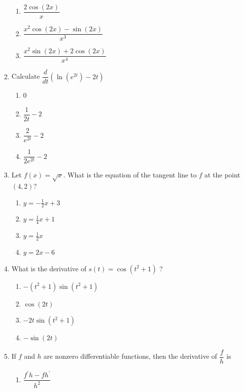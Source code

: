 \documentclass{article}
\begin{document}
\begin{enumerate}
\begin{minipage}[t]{\linewidth}
\begin{enumerate}
			\item  $\dfrac{ 2 \cos(2x)}{x}$
			\item  $\dfrac{ x^2 \cos(2x) - \sin(2x)} { x^3}$
			\item  $\dfrac{ x^2 \sin(2x) + 2 \cos(2x)} {x^4}$
		\end{enumerate}
	\end{minipage}
	\item
	\begin{minipage}[t]{\linewidth}
		Calculate \(\dfrac{d}{dt} \left( \ln(e^{2t}) - 2t \right)\)\\[0.1em]
		\begin{enumerate}
		\itemsep1em
		\item  0
			\item  $\dfrac{1}{2t}-2$
			\item  $\dfrac{2}{e^{2t}}-2$
			\item  $\dfrac{1}{2e^{2t}}-2$
		\end{enumerate}
	\end{minipage}
	\item
	\begin{minipage}[t]{\linewidth}
		Let \(f(x)=\sqrt{x}\). What is the equation of the tangent line to \(f\)
at the point \((4,2)\)?\\[0.1em]
		\begin{enumerate}
		\itemsep1em
			\item  $y=-\frac{1}{2} x+3$
			\item  $y=\frac{1}{4} x+1$

			\item  $y=\frac{1}{2} x$
			\item  $y=2 x-6$
		\end{enumerate}
	\end{minipage}
	\item
	\begin{minipage}[t]{\linewidth}
		What is the derivative of \(s(t)=\cos \left(t^2 + 1\right)\) ?\\[0.1em]
		\begin{enumerate}
		\itemsep1em
			\item  $-(t^2+1)\sin(t^2+1)$
			\item  $\cos(2t)$
			\item  $-2t\sin(t^2+1)$

			\item  $-\sin(2t)$
		\end{enumerate}
	\end{minipage}
	\item
	\begin{minipage}[t]{\linewidth}
		If \(f\) and \(h\) are nonzero differentiable functions, then the
derivative of \(\dfrac{f}{h}\) is\\[0.1em]
		\begin{enumerate}
		\itemsep1em
		\item  $\dfrac{f^{\prime} h - f h^{\prime}}{h^2}$


\end{enumerate}
\end{minipage}
\end{enumerate}
\end{document}
